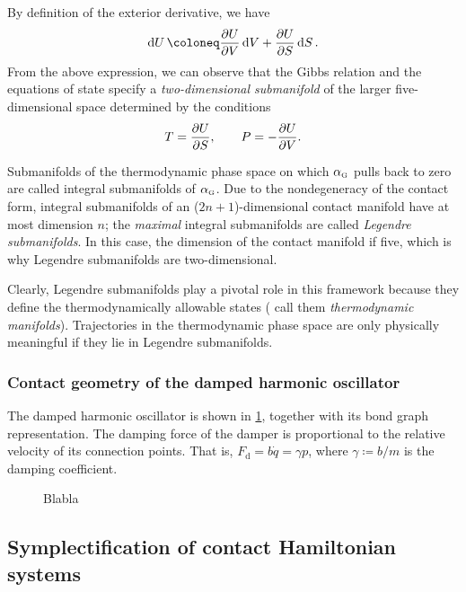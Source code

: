 By definition of the exterior derivative, we have
$$ \dd{U} \coloneq \pdv{U}{V}\dd{V} + \pdv{U}{S}\dd{S}.$$
From the above expression, we can observe that the Gibbs relation and the equations of state specify a \emph{two-dimensional submanifold} of the larger five-dimensional space determined by the conditions
\begin{equation}
    T = \pdv{U}{S}, \qquad P = -\pdv{U}{V}. 
\end{equation}

Submanifolds of the thermodynamic phase space on which $\alpha_\text{\tiny G}$ pulls back to zero are called integral submanifolds of $\alpha_\text{\tiny G}$. Due to the nondegeneracy of the contact form, integral submanifolds of an ($2n+1$)-dimensional contact manifold have at most dimension $n$; the \emph{maximal} integral submanifolds are called \emph{Legendre submanifolds}. In this case, the dimension of the contact manifold if five, which is why Legendre submanifolds are two-dimensional.

Clearly, Legendre submanifolds play a pivotal role in this framework because they define the thermodynamically allowable states (\citet{Balian2001} call them \emph{thermodynamic manifolds}). Trajectories in the thermodynamic phase space are only physically meaningful if they lie in Legendre submanifolds.

\subsubsection{Contact geometry of the damped harmonic oscillator}
The damped harmonic oscillator is shown in \cref{fig:dho}, together with its bond graph representation. The damping force of the damper is proportional to the relative velocity of its connection points. That is, $F_\text{d} = b \dot{q} = \gamma p $, where $\gamma \coloneq b/m$ is the damping coefficient.
\begin{figure}[ht!]
    \centering
    
    \caption{Blabla}
    \label{fig:dho}
\end{figure}



\subsection{Symplectification of contact Hamiltonian systems}
\label{ssec:symplectification}




